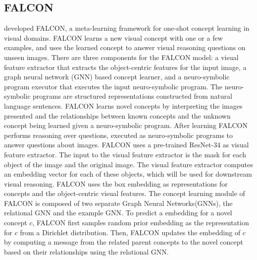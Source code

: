 \subsection{FALCON}
\citet{mei2022falcon} developed FALCON, a meta-learning framework for one-shot concept learning in visual domains.
FALCON learns a new visual concept with one or a few examples, and uses the learned concept to answer visual reasoning questions on unseen images.
There are three components for the FALCON model: a visual feature extractor that extracts the object-centric features for the input image, a graph neural network (GNN) based concept learner, and a neuro-symbolic program executor that executes the input neuro-symbolic program.
The neuro-symbolic programs are structured representations constructed from natural language sentences.
FALCON learns novel concepts by interpreting the images presented and the relationships between known concepts and the unknown concept being learned given a neuro-symbolic program. 
After learning FALCON performs reasoning over questions, executed as neuro-symbolic programs to answer questions about images. 
FALCON uses a pre-trained ResNet-34 as visual feature extractor.
The input to the visual feature extractor is the mask for each object of the image and the original image.
The visual feature extractor computes an embedding vector for each of these objects, which will be used for downstream visual reasoning.
FALCON uses the box embedding\citep{vilnis2018probabilistic} as representations for concepts and the object-centric visual features.
The concept learning module of FALCON is composed of two separate Graph Neural Networks(GNNs), the relational GNN and the example GNN.
To predict a embedding for a novel concept $c$, FALCON first samples random prior embedding as the representation for $c$ from a Dirichlet distribution.
Then, FALCON updates the embedding of $c$ by computing a message from the related parent concepts to the novel concept based on their relationships using the relational GNN.
